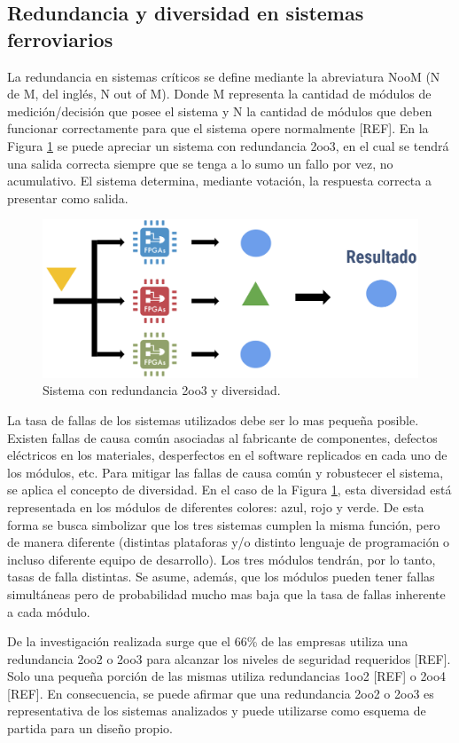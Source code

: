 \subsection{Redundancia y diversidad en sistemas ferroviarios}

La redundancia en sistemas críticos se define mediante la abreviatura NooM (N de M, del inglés, N out of M). Donde M representa la cantidad de módulos de medición/decisión que posee el sistema y N la cantidad de módulos que deben funcionar correctamente para que el sistema opere normalmente [REF]. En la Figura \ref{fig:redundancia} se puede apreciar un sistema con redundancia 2oo3, en el cual se tendrá una salida correcta siempre que se tenga a lo sumo un fallo por vez, no acumulativo. El sistema determina, mediante votación, la respuesta correcta a presentar como salida.

\begin{figure}[h]
	\centering
	\includegraphics[width=1\textwidth]{Figuras/redundancia.png}
	\centering\caption{Sistema con redundancia 2oo3 y diversidad.}
	\label{fig:redundancia}
\end{figure}

La tasa de fallas de los sistemas utilizados debe ser lo mas pequeña posible. Existen fallas de causa común asociadas al fabricante de componentes, defectos eléctricos en los materiales, desperfectos en el software replicados en cada uno de los módulos, etc. Para mitigar las fallas de causa común y robustecer el sistema, se aplica el concepto de diversidad. En el caso de la Figura \ref{fig:redundancia}, esta diversidad está representada en los módulos de diferentes colores: azul, rojo y verde. De esta forma se busca simbolizar que los tres sistemas cumplen la misma función, pero de manera diferente (distintas plataforas y/o distinto lenguaje de programación o incluso diferente equipo de desarrollo). Los tres módulos tendrán, por lo tanto, tasas de falla distintas. Se asume, además, que los módulos pueden tener fallas simultáneas pero de probabilidad mucho mas baja que la tasa de fallas inherente a cada módulo.

De la investigación realizada surge que el 66\% de las empresas utiliza una redundancia 2oo2 o 2oo3 para alcanzar los niveles de seguridad requeridos [REF]. Solo una pequeña porción de las mismas utiliza redundancias 1oo2 [REF] o 2oo4 [REF]. En consecuencia, se puede afirmar que una redundancia 2oo2 o 2oo3 es representativa de los sistemas analizados y puede utilizarse como esquema de partida para un diseño propio.